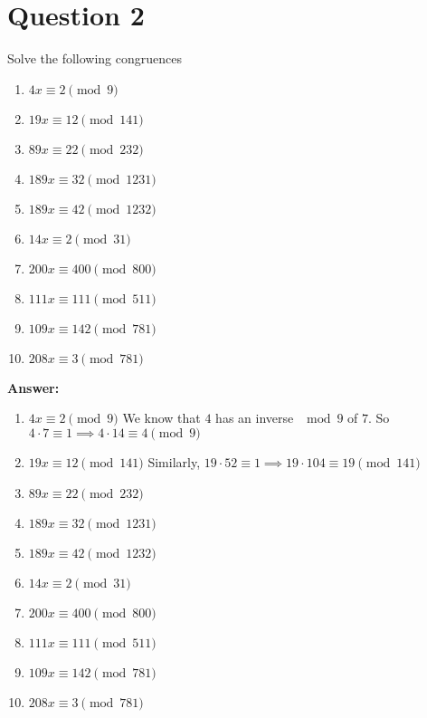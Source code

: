 \documentclass[openany]{report}
\begin{document}
\section{Question 2}
Solve the following congruences
\begin{enumerate}[label=(\alph*)]
    \item $4x \equiv 2 \pmod{9}$
    \item $19x \equiv 12 \pmod{141}$
    \item $89x \equiv 22 \pmod{232}$
    \item $189x \equiv 32 \pmod{1231}$
    \item $189x \equiv 42 \pmod{1232}$
    \item $14x \equiv 2 \pmod{31}$
    \item $200x \equiv 400 \pmod{800}$
    \item $111x \equiv 111 \pmod{511}$
    \item $109x \equiv 142 \pmod{781}$
    \item $208x \equiv 3 \pmod{781}$
\end{enumerate}
\textbf{Answer:}
\begin{enumerate}[label=(\alph*)]
    \item $4x \equiv 2 \pmod{9}$
    We know that $4$ has an inverse $\mod 9$ of $7$.
    So $4 \cdot 7 \equiv 1 \implies 4 \cdot 14 \equiv 4 \pmod{9}$ 
    \item $19x \equiv 12 \pmod{141}$
    Similarly, $19 \cdot 52 \equiv 1 \implies 19 \cdot 104 \equiv 19 \pmod{141}$
    \item $89x \equiv 22 \pmod{232}$
    \item $189x \equiv 32 \pmod{1231}$
    \item $189x \equiv 42 \pmod{1232}$
    \item $14x \equiv 2 \pmod{31}$
    \item $200x \equiv 400 \pmod{800}$
    \item $111x \equiv 111 \pmod{511}$
    \item $109x \equiv 142 \pmod{781}$
    \item $208x \equiv 3 \pmod{781}$
\end{enumerate}
\end{document}
